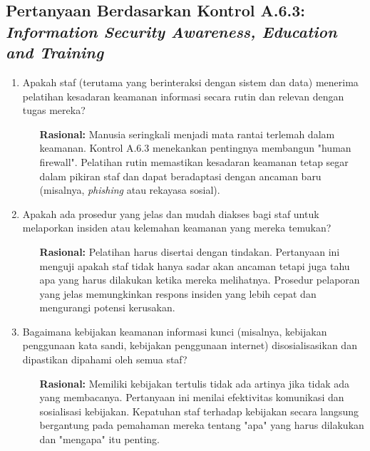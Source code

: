\documentclass[12pt, a4paper]{report}
\begin{document}
\subsection{Pertanyaan Berdasarkan Kontrol A.6.3: \textit{Information Security Awareness, Education and Training}}
\begin{enumerate}
    \item Apakah staf (terutama yang berinteraksi dengan sistem dan data) menerima pelatihan kesadaran keamanan informasi secara rutin dan relevan dengan tugas mereka?
    \begin{itemize}
        \item[\textbf{Rasional:}] Manusia seringkali menjadi mata rantai terlemah dalam keamanan. Kontrol A.6.3 menekankan pentingnya membangun "human firewall". Pelatihan rutin memastikan kesadaran keamanan tetap segar dalam pikiran staf dan dapat beradaptasi dengan ancaman baru (misalnya, \textit{phishing} atau rekayasa sosial).
    \end{itemize}

    \item Apakah ada prosedur yang jelas dan mudah diakses bagi staf untuk melaporkan insiden atau kelemahan keamanan yang mereka temukan?
    \begin{itemize}
        \item[\textbf{Rasional:}] Pelatihan harus disertai dengan tindakan. Pertanyaan ini menguji apakah staf tidak hanya sadar akan ancaman tetapi juga tahu apa yang harus dilakukan ketika mereka melihatnya. Prosedur pelaporan yang jelas memungkinkan respons insiden yang lebih cepat dan mengurangi potensi kerusakan.
    \end{itemize}
    
    \item Bagaimana kebijakan keamanan informasi kunci (misalnya, kebijakan penggunaan kata sandi, kebijakan penggunaan internet) disosialisasikan dan dipastikan dipahami oleh semua staf? \citep{pratama2022pelatihan}
    \begin{itemize}
        \item[\textbf{Rasional:}] Memiliki kebijakan tertulis tidak ada artinya jika tidak ada yang membacanya. Pertanyaan ini menilai efektivitas komunikasi dan sosialisasi kebijakan. Kepatuhan staf terhadap kebijakan secara langsung bergantung pada pemahaman mereka tentang "apa" yang harus dilakukan dan "mengapa" itu penting.
    \end{itemize}
\end{enumerate}
\end{document}

